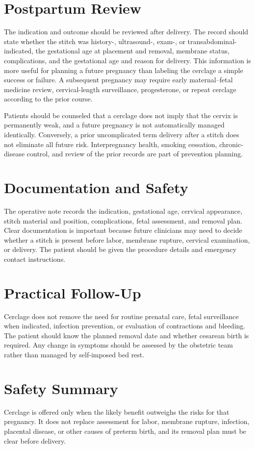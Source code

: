 \section*{Postpartum Review}
The indication and outcome should be reviewed after delivery. The record should state whether the stitch was history-, ultrasound-, exam-, or transabdominal-indicated, the gestational age at placement and removal, membrane status, complications, and the gestational age and reason for delivery. This information is more useful for planning a future pregnancy than labeling the cerclage a simple success or failure. A subsequent pregnancy may require early maternal--fetal medicine review, cervical-length surveillance, progesterone, or repeat cerclage according to the prior course.

Patients should be counseled that a cerclage does not imply that the cervix is permanently weak, and a future pregnancy is not automatically managed identically. Conversely, a prior uncomplicated term delivery after a stitch does not eliminate all future risk. Interpregnancy health, smoking cessation, chronic-disease control, and review of the prior records are part of prevention planning.

\section*{Documentation and Safety}
The operative note records the indication, gestational age, cervical appearance, stitch material and position, complications, fetal assessment, and removal plan. Clear documentation is important because future clinicians may need to decide whether a stitch is present before labor, membrane rupture, cervical examination, or delivery. The patient should be given the procedure details and emergency contact instructions.

\section*{Practical Follow-Up}
Cerclage does not remove the need for routine prenatal care, fetal surveillance when indicated, infection prevention, or evaluation of contractions and bleeding. The patient should know the planned removal date and whether cesarean birth is required. Any change in symptoms should be assessed by the obstetric team rather than managed by self-imposed bed rest.

\section*{Safety Summary}
Cerclage is offered only when the likely benefit outweighs the risks for that pregnancy. It does not replace assessment for labor, membrane rupture, infection, placental disease, or other causes of preterm birth, and its removal plan must be clear before delivery.


